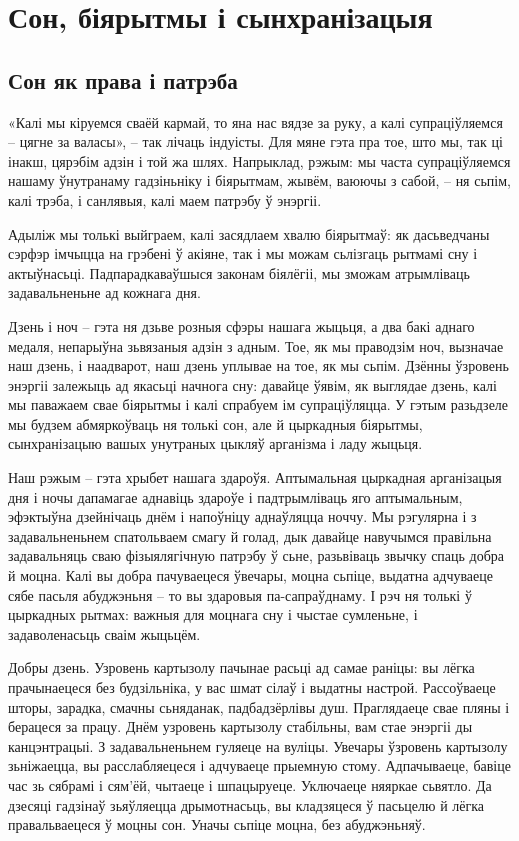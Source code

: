 \chapter{Сон, біярытмы і сынхранізацыя}

\section{Сон як права і патрэба}

«Калі мы кіруемся сваёй кармай, то яна нас вядзе за руку, а калі супраціўляемся – цягне за валасы», – так лічаць індуісты. Для мяне гэта пра тое, што мы, так ці інакш, цярэбім адзін і той жа шлях. Напрыклад, рэжым: мы часта супраціўляемся нашаму ўнутранаму гадзіньніку і біярытмам, жывём, ваюючы з сабой, -- ня сьпім, калі трэба, і санлявыя, калі маем патрэбу ў энэргіі.

Адыліж мы толькі выйграем, калі засядлаем хвалю біярытмаў: як дасьведчаны сэрфэр імчыцца на грэбені ў акіяне, так і мы можам сьлізгаць рытмамі сну і актыўнасьці. Падпарадкаваўшыся законам біялёгіі, мы зможам атрымліваць задавальненьне ад кожнага дня.

Дзень і ноч – гэта ня дзьве розныя сфэры нашага жыцьця, а два бакі аднаго медаля, непарыўна зьвязаныя адзін з адным. Тое, як мы праводзім ноч, вызначае наш дзень, і наадварот, наш дзень уплывае на тое, як мы сьпім. Дзённы ўзровень энэргіі залежыць ад якасьці начнога сну: давайце ўявім, як выглядае дзень, калі мы паважаем свае біярытмы і калі спрабуем ім супраціўляцца. У гэтым разьдзеле мы будзем абмяркоўваць ня толькі сон, але й цыркадныя біярытмы, сынхранізацыю вашых унутраных цыкляў арганізма і ладу жыцьця.

Наш рэжым – гэта хрыбет нашага здароўя. Аптымальная цыркадная арганізацыя дня і ночы дапамагае аднавіць здароўе і падтрымліваць яго аптымальным, эфэктыўна дзейнічаць днём і напоўніцу аднаўляцца ноччу. Мы рэгулярна і з задавальненьнем спатольваем смагу й голад, дык давайце навучымся правільна задавальняць сваю фізыялягічную патрэбу ў сьне, разьвіваць звычку спаць добра й моцна. Калі вы добра пачуваецеся ўвечары, моцна сьпіце, выдатна адчуваеце сябе пасьля абуджэньня – то вы здаровыя па-сапраўднаму. І рэч ня толькі ў цыркадных рытмах: важныя для моцнага сну і чыстае сумленьне, і задаволенасьць сваім жыцьцём.

Добры дзень. Узровень картызолу пачынае расьці ад самае раніцы: вы лёгка прачынаецеся без будзільніка, у вас шмат сілаў і выдатны настрой. Рассоўваеце шторы, зарадка, смачны сьняданак, падбадзёрлівы душ. Праглядаеце свае пляны і берацеся за працу. Днём узровень картызолу стабільны, вам стае энэргіі ды канцэнтрацыі. З задавальненьнем гуляеце на вуліцы. Увечары ўзровень картызолу зьніжаецца, вы расслабляецеся і адчуваеце прыемную стому. Адпачываеце, бавіце час зь сябрамі і сям'ёй, чытаеце і шпацыруеце. Уключаеце няяркае сьвятло. Да дзесяці гадзінаў зьяўляецца дрымотнасьць, вы кладзяцеся ў пасьцелю й лёгка правальваецеся ў моцны сон. Уначы сьпіце моцна, без абуджэньняў.

